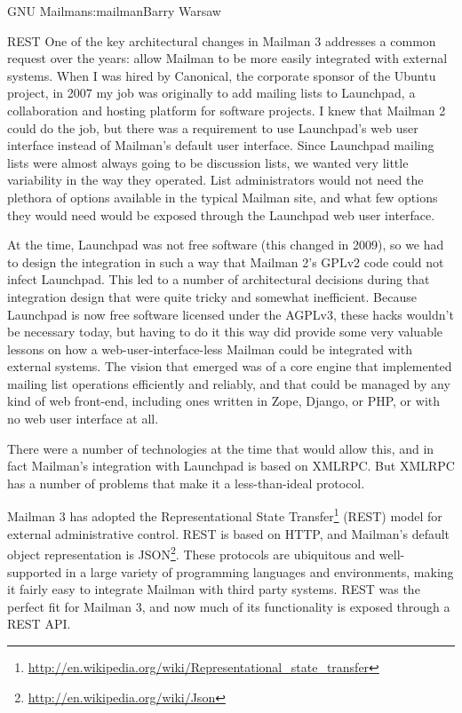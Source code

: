\begin{aosachapter}{GNU Mailman}{s:mailman}{Barry Warsaw}
\begin{aosasect1}{REST}
One of the key architectural changes in Mailman 3 addresses a common
request over the years: allow Mailman to be more easily integrated
with external systems.  When I was hired by Canonical, the corporate sponsor of the Ubuntu project, in 2007 my job
was originally to add mailing lists to Launchpad, a collaboration and
hosting platform for software projects.  I knew that Mailman
2 could do the job, but there was a requirement to use Launchpad's web
user interface instead of Mailman's default user interface.  Since
Launchpad mailing lists were almost always going to be discussion
lists, we wanted very little variability in the way they operated.
List administrators would not need the plethora of options available
in the typical Mailman site, and what few options they would need
would be exposed through the Launchpad web user interface.

At the time, Launchpad was not free software (this changed in 2009), so
we had to design the integration in such a way that Mailman 2's GPLv2
code could not infect Launchpad.  This led to a number of
architectural decisions during that integration design that were quite
tricky and somewhat inefficient.  Because Launchpad is now free
software licensed under the AGPLv3, these hacks wouldn't be necessary today, but having to do it
this way did provide some very valuable lessons on how a 
web-user-interface-less Mailman could be integrated with external systems.  The
vision that emerged was of a core engine that implemented mailing list
operations efficiently and reliably, and that could be managed by any
kind of web front-end, including ones written in Zope, Django, or PHP,
or with no web user interface at all.

There were a number of technologies at the time that would allow this,
and in fact Mailman's integration with Launchpad is based on XMLRPC.
But XMLRPC has a number of problems that make it a less-than-ideal
protocol.

Mailman 3 has adopted the Representational State
Transfer\footnote{\url{http://en.wikipedia.org/wiki/Representational_state_transfer}}
(REST) model for external administrative control.  REST is based on
HTTP, and Mailman's default object representation is
JSON\footnote{\url{http://en.wikipedia.org/wiki/Json}}.  These
protocols are ubiquitous and well-supported in a large variety of
programming languages and environments, making it fairly easy to
integrate Mailman with third party systems.  REST was the perfect fit
for Mailman 3, and now much of its functionality is exposed through a
REST API.


\end{aosasect1}
\end{aosachapter}
